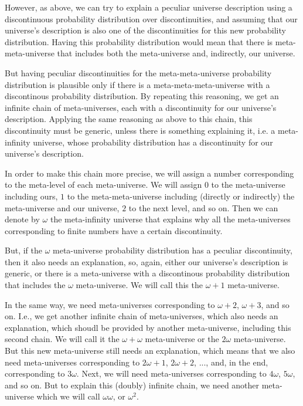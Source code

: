 \documentclass[a4paper
]{article}
\begin{document}
However, as above, we can try to explain a peculiar universe description
using a discontinuous probability distribution over discontinuities,
and assuming that our universe's description is also one of the
discontinuities for this new probability distribution.
Having this probability distribution would mean that there is
meta-meta-universe that includes both the meta-universe and, indirectly,
our universe.

But having peculiar discontinuities for the meta-meta-universe probability
distribution is plausible only if there is a meta-meta-meta-universe
with a discontinous probability distribution.
By repeating this reasoning, we get an infinite chain of meta-universes,
each with a discontinuity for our universe's
description.
Applying the same reasoning as above to this chain, this discontinuity
must be generic,
unless there is something explaining it, i.e. a meta-infinity universe,
whose probability distribution has a discontinuity for our universe's
description.

In order to make this chain more precise, we will assign a number corresponding
to the meta-level of each meta-universe.
We will assign $0$ to the meta-universe including ours, $1$ to the
meta-meta-universe including (directly or indirectly) the meta-universe and our
universe, $2$ to the next level, and so on.
Then we can denote by $\omega$ the meta-infinity universe that explains why all
the meta-universes corresponding to finite numbers have a certain discontinuity.

But, if the $\omega$ meta-universe probability distribution has a peculiar
discontinuity, then it also needs an explanation, so, again,
either our universe's
description is generic, or there is a meta-universe with a discontinous
probability distribution that includes the
$\omega$ meta-universe.
We will call this the $\omega + 1$ meta-universe.

In the same way, we need meta-universes corresponding to $\omega + 2$,
$\omega + 3$, and so on.
I.e., we get another infinite chain of meta-universes, which also needs an
explanation, which shoudl be provided by another meta-universe, including this
second chain. We will call it the $\omega + \omega$ meta-universe
or the $2\omega$ meta-universe.
But this new meta-universe still needs an explanation,
which means that we also need
meta-universes corresponding to $2\omega + 1$, $2\omega + 2$, ..., and,
in the end, corresponding to $3\omega$.
Next, we will need meta-universes
corresponding to $4\omega$, $5\omega$, and so on.
But to explain this (doubly) infinite chain,
we need another meta-universe which we
will call $\omega\omega$, or $\omega^2$.
\end{document}
